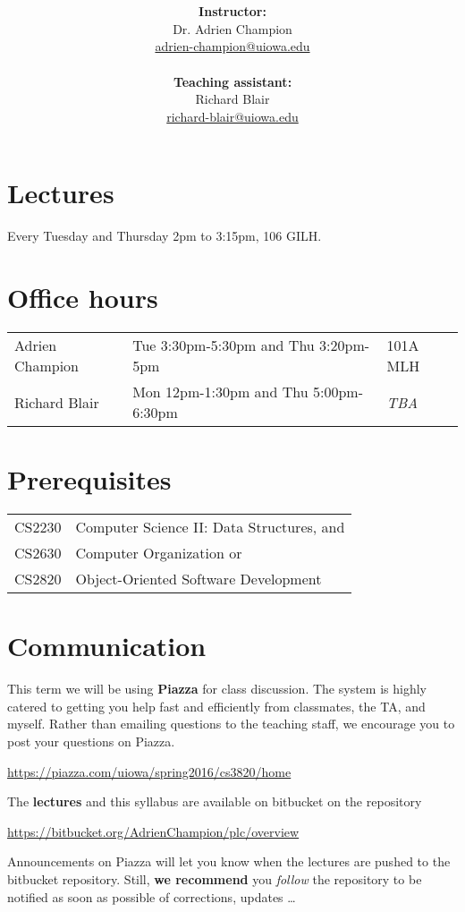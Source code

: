 \documentclass[10pt]{article}
\title{
  \articleTitle
}
\author{
  \begin{minipage}{.5\textwidth}
    \centering
    \textbf{Instructor:}\\
    Dr. Adrien Champion\\
    \href{mailto:adrien-champion@uiowa.edu}{adrien-champion@uiowa.edu}\\[2pt]
  \end{minipage}
  \begin{minipage}{.5\textwidth}
    \centering
    \textbf{Teaching assistant:}\\
    Richard Blair\\
    \href{mailto:richard-blair@uiowa.edu}{richard-blair@uiowa.edu}
  \end{minipage}
}
\date{}
\newcommand{\ita}[1]{\textit{#1}}
\newcommand{\tba}{\ita{TBA}\xspace}
\begin{document}
\maketitle

\section*{Lectures}
Every Tuesday and Thursday 2pm to 3:15pm, 106 GILH.


\section*{Office hours}
\begin{tabular}{l | l l}
  Adrien Champion & Tue 3:30pm-5:30pm and Thu 3:20pm-5pm & 101A MLH \\
  Richard Blair & Mon 12pm-1:30pm and Thu 5:00pm-6:30pm & \tba \\
\end{tabular}


\section*{Prerequisites}
\begin{tabular}{l l}
  CS$2230$ & Computer Science II: Data Structures, and \\
  CS$2630$ & Computer Organization or \\
  CS$2820$ & Object-Oriented Software Development
\end{tabular}


\section*{Communication}

This term we will be using \textbf{Piazza} for class discussion. The system is
highly catered to getting you help fast and efficiently from classmates, the
TA, and myself. Rather than emailing questions to the teaching staff, we
encourage you to post your questions on Piazza.

\centerline{
  \url{https://piazza.com/uiowa/spring2016/cs3820/home}
}

\noindent
The \textbf{lectures} and this syllabus are available on bitbucket on the
repository

\centerline{
  \url{https://bitbucket.org/AdrienChampion/plc/overview}
}

\noindent
Announcements on Piazza will let you know when the lectures are pushed to the
bitbucket repository. Still, \textbf{we recommend} you \ita{follow} the
repository to be notified as soon as possible of corrections, updates \ldots
\end{document}
